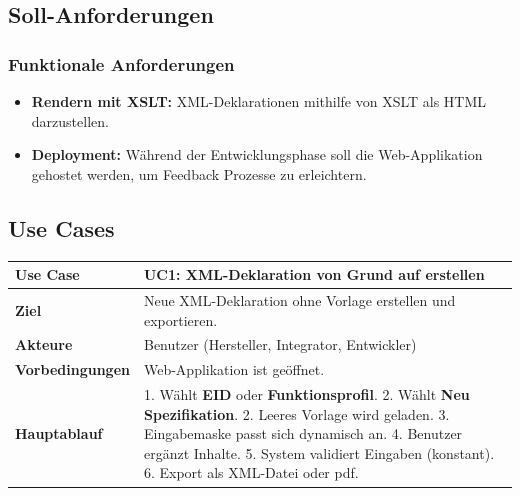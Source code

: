 \documentclass[a4paper,12pt]{article}
\begin{document}
\subsection{Soll-Anforderungen}
\subsubsection{Funktionale Anforderungen}
\begin{itemize}
  \item \textbf{Rendern mit XSLT:}  
    XML-Deklarationen mithilfe von XSLT als HTML darzustellen.
  \item \textbf{Deployment:}  
    Während der Entwicklungsphase soll die Web-Applikation gehostet werden, um Feedback Prozesse zu erleichtern.
\end{itemize}


\newpage

\subsection{Use Cases}


\begin{table}[h!]
\centering
\renewcommand{\arraystretch}{1.2}
\begin{tabularx}{\textwidth}{|l|X|}
\hline
\textbf{Use Case} & \textbf{UC1: XML-Deklaration von Grund auf erstellen} \\ \hline
\textbf{Ziel} & Neue XML-Deklaration ohne Vorlage erstellen und exportieren. \\ \hline
\textbf{Akteure} & Benutzer (Hersteller, Integrator, Entwickler) \\ \hline
\textbf{Vorbedingungen} & Web-Applikation ist geöffnet.\\ \hline
\textbf{Hauptablauf} &
1. Wählt \textbf{EID} oder \textbf{Funktionsprofil}. 2. Wählt \textbf{Neu Spezifikation}. 2. Leeres Vorlage wird geladen. 3. Eingabemaske passt sich dynamisch an. 4. Benutzer ergänzt Inhalte. 5. System validiert Eingaben (konstant). 6. Export als XML-Datei oder pdf. \\ \hline
\end{tabularx}
\end{table}
\end{document}
